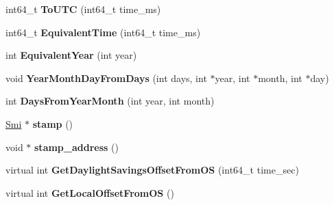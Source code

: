 \begin{DoxyCompactItemize}
\item 
\hypertarget{classv8_1_1internal_1_1_date_cache_aa9c27e444fd19db8bd922f49510906e4}{}int64\+\_\+t {\bfseries To\+U\+T\+C} (int64\+\_\+t time\+\_\+ms)\label{classv8_1_1internal_1_1_date_cache_aa9c27e444fd19db8bd922f49510906e4}

\item 
\hypertarget{classv8_1_1internal_1_1_date_cache_af3dd4e80a7ac5044eeb20817d6134bd1}{}int64\+\_\+t {\bfseries Equivalent\+Time} (int64\+\_\+t time\+\_\+ms)\label{classv8_1_1internal_1_1_date_cache_af3dd4e80a7ac5044eeb20817d6134bd1}

\item 
\hypertarget{classv8_1_1internal_1_1_date_cache_a0c170e47eb85e4d7ee1a991290571685}{}int {\bfseries Equivalent\+Year} (int year)\label{classv8_1_1internal_1_1_date_cache_a0c170e47eb85e4d7ee1a991290571685}

\item 
\hypertarget{classv8_1_1internal_1_1_date_cache_a5aa2a0800947deeb859a1392cb4e050d}{}void {\bfseries Year\+Month\+Day\+From\+Days} (int days, int $\ast$year, int $\ast$month, int $\ast$day)\label{classv8_1_1internal_1_1_date_cache_a5aa2a0800947deeb859a1392cb4e050d}

\item 
\hypertarget{classv8_1_1internal_1_1_date_cache_a1eab5288c1b1da6639e14bf4e93509d3}{}int {\bfseries Days\+From\+Year\+Month} (int year, int month)\label{classv8_1_1internal_1_1_date_cache_a1eab5288c1b1da6639e14bf4e93509d3}

\item 
\hypertarget{classv8_1_1internal_1_1_date_cache_a300296627a0a914acde15d6c8b92a047}{}\hyperlink{classv8_1_1internal_1_1_smi}{Smi} $\ast$ {\bfseries stamp} ()\label{classv8_1_1internal_1_1_date_cache_a300296627a0a914acde15d6c8b92a047}

\item 
\hypertarget{classv8_1_1internal_1_1_date_cache_ae977601d5642d31a9b6ed482fb5bc869}{}void $\ast$ {\bfseries stamp\+\_\+address} ()\label{classv8_1_1internal_1_1_date_cache_ae977601d5642d31a9b6ed482fb5bc869}

\item 
\hypertarget{classv8_1_1internal_1_1_date_cache_a0414713d5ff25ceba3e28895eac1a11d}{}virtual int {\bfseries Get\+Daylight\+Savings\+Offset\+From\+O\+S} (int64\+\_\+t time\+\_\+sec)\label{classv8_1_1internal_1_1_date_cache_a0414713d5ff25ceba3e28895eac1a11d}

\item 
\hypertarget{classv8_1_1internal_1_1_date_cache_a18150386224c00b71e53bf68a28b25f1}{}virtual int {\bfseries Get\+Local\+Offset\+From\+O\+S} ()\label{classv8_1_1internal_1_1_date_cache_a18150386224c00b71e53bf68a28b25f1}

\end{DoxyCompactItemize}
